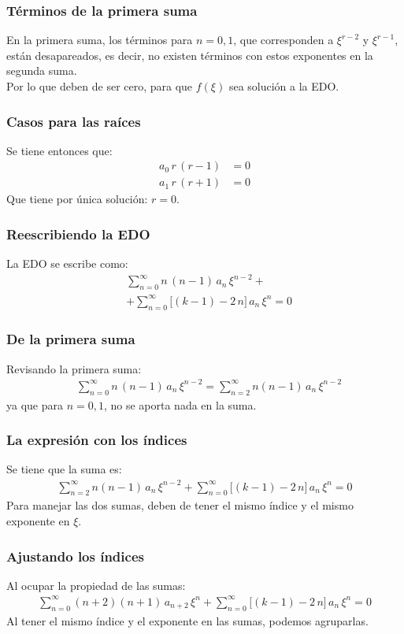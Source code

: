 \documentclass[12pt]{beamer}
\begin{document}
\begin{frame}
\frametitle{Términos de la primera suma}
En la primera suma, los términos para $n = 0, 1$, que corresponden a $\xi^{r-2}$ y $\xi^{r-1}$, están desapareados, \pause es decir, no existen términos con estos exponentes en la segunda suma.
\\
\bigskip
\pause
Por lo que deben de ser cero, para que $f(\xi)$ sea solución a la EDO.
\end{frame}
\begin{frame}
\frametitle{Casos para las raíces}
Se tiene entonces que:
\pause
\begin{align*}
a_{0} \, r \, (r - 1) &= 0 \\[0.5em]
a_{1} \, r \, (r + 1) &= 0
\end{align*}
\pause
Que tiene por única solución: $r = 0$.
\end{frame}
\begin{frame}
\frametitle{Reescribiendo la EDO}
La EDO se escribe como:
\pause
\begin{align*}
&\sum_{n=0}^{\infty} n \, (n {-} 1) \, a_{n}  \, \xi^{n-2} + \\[0.5em] 
&+ \sum_{n=0}^{\infty} \bigg[ (k {-} 1) {-} 2 \, n \bigg] \, a_{n} \, \xi^{n} = 0
\end{align*}
\end{frame}
\begin{frame}
\frametitle{De la primera suma}
Revisando la primera suma:
\pause
\begin{align*}
&\sum_{n=0}^{\infty} n \, (n {-} 1) \, a_{n}  \, \xi^{n-2} = \sum_{n=2}^{\infty} n (n {-} 1) \, a_{n} \, \xi^{n-2}        
\end{align*}
ya que para $n = 0, 1$, no se aporta nada en la suma.
\end{frame}
\begin{frame}
\frametitle{La expresión con los índices}
Se tiene que la suma es:
\pause
\begin{align*}
\sum_{n=2}^{\infty} n (n {-} 1) \, a_{n} \, \xi^{n-2} + \sum_{n=0}^{\infty} \bigg[ (k {-} 1) {-} 2 \, n \bigg] \, a_{n} \, \xi^{n} = 0
\end{align*}
\pause
Para manejar las dos sumas, deben de tener el mismo índice y el mismo exponente en $\xi$.
\end{frame}
\begin{frame}
\frametitle{Ajustando los índices}
Al ocupar la propiedad de las sumas:
\pause
\begin{align*}
\sum_{n=0}^{\infty} (n {+} 2)(n {+} 1) \, a_{n+2} \, \xi^{n} + \sum_{n=0}^{\infty} \bigg[ (k {-} 1) {-} 2 \, n \bigg] \, a_{n} \, \xi^{n} = 0
\end{align*}
\pause
Al tener el mismo índice y el exponente en las sumas, podemos agruparlas.
\end{frame}
\end{document}
